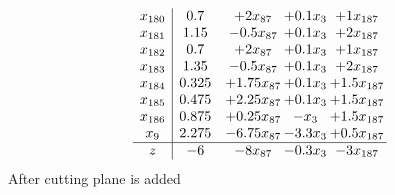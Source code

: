 \documentclass[11pt]{article}
\begin{document}
\[\begin{array}{c| c c@{\hskip 2pt} c@{\hskip 2pt} c@{\hskip 2pt} }
 x_{180}   &  0.7 & + 2 x_{87} & + 0.1 x_{3} & + 1 x_{187}\\
 x_{181}   &  1.15 & -0.5 x_{87} & + 0.1 x_{3} & + 2 x_{187}\\
 x_{182}   &  0.7 & + 2 x_{87} & + 0.1 x_{3} & + 1 x_{187}\\
 x_{183}   &  1.35 & -0.5 x_{87} & + 0.1 x_{3} & + 2 x_{187}\\
 x_{184}   &  0.325 & + 1.75 x_{87} & + 0.1 x_{3} & + 1.5 x_{187}\\
 x_{185}   &  0.475 & + 2.25 x_{87} & + 0.1 x_{3} & + 1.5 x_{187}\\
 x_{186}   &  0.875 & + 0.25 x_{87} & - x_{3} & + 1.5 x_{187}\\
 x_{9}   &  2.275 & -6.75 x_{87} & -3.3 x_{3} & + 0.5 x_{187}\\
\hline
z    &  -6 & -8 x_{87} & -0.3 x_{3} & -3 x_{187}\\
\end{array}\]
 After cutting plane is added 
\end{document}
